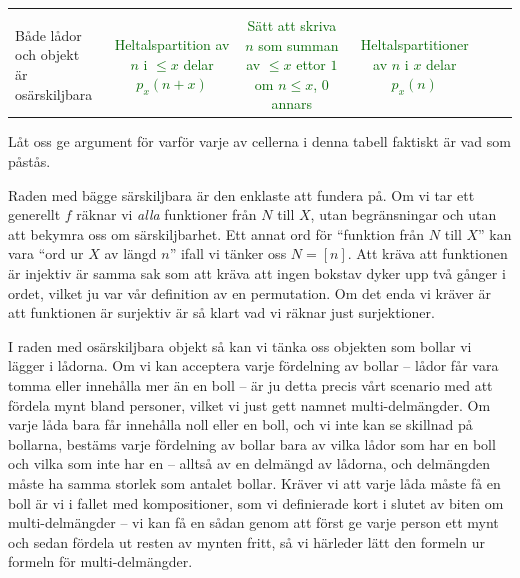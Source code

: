 \documentclass[nobib]{tufte-handout}
\begin{document}
\begin{fullwidth}
\begin{tabularx}{\linewidth}{l|ccc}
    &  &  & \\

     \specialcell{Både lådor och objekt\\ är osärskiljbara} & \specialcell{\textcolor{darkgreen}{Heltalspartition av $n$} \\ {\textcolor{darkgreen}{i $\leq x$ delar}}\\\textcolor{darkgreen}{$p_x(n + x)$}} & \specialcell{\textcolor{darkgreen}{Sätt att skriva $n$ som}\\\textcolor{darkgreen}{summan av $\leq x$ ettor}\\\textcolor{darkgreen}{$1$ om $n \leq x$, $0$ annars}} & \specialcell{\textcolor{darkgreen}{Heltalspartitioner}\\ \textcolor{darkgreen}{ av $n$ i $x$ delar} \\\textcolor{darkgreen}{$p_x(n)$}}
    
    &  &  & \\
\end{tabularx}
\end{fullwidth}

\hfill \break

Låt oss ge argument för varför varje av cellerna i denna tabell faktiskt är vad som påstås.

Raden med bägge särskiljbara är den enklaste att fundera på. Om vi tar ett generellt $f$ räknar vi \emph{alla} funktioner från $N$ till $X$, utan begränsningar och utan att bekymra oss om särskiljbarhet. Ett annat ord för ``funktion från $N$ till $X$'' kan vara ``ord ur $X$ av längd $n$'' ifall vi tänker oss $N = [n]$. Att kräva att funktionen är injektiv är samma sak som att kräva att ingen bokstav dyker upp två gånger i ordet, vilket ju var vår definition av en permutation. Om det enda vi kräver är att funktionen är surjektiv är så klart vad vi räknar just surjektioner. 

I raden med osärskiljbara objekt så kan vi tänka oss objekten som bollar vi lägger i lådorna. Om vi kan acceptera varje fördelning av bollar -- lådor får vara tomma eller innehålla mer än en boll -- är ju detta precis vårt scenario med att fördela mynt bland personer, vilket vi just gett namnet multi-delmängder. Om varje låda bara får innehålla noll eller en boll, och vi inte kan se skillnad på bollarna, bestäms varje fördelning av bollar bara av vilka lådor som har en boll och vilka som inte har en -- alltså av en delmängd av lådorna, och delmängden måste ha samma storlek som antalet bollar. Kräver vi att varje låda måste få en boll är vi i fallet med kompositioner, som vi definierade kort i slutet av biten om multi-delmängder -- vi kan få en sådan genom att först ge varje person ett mynt och sedan fördela ut resten av mynten fritt, så vi härleder lätt den formeln ur formeln för multi-delmängder.
\end{document}
